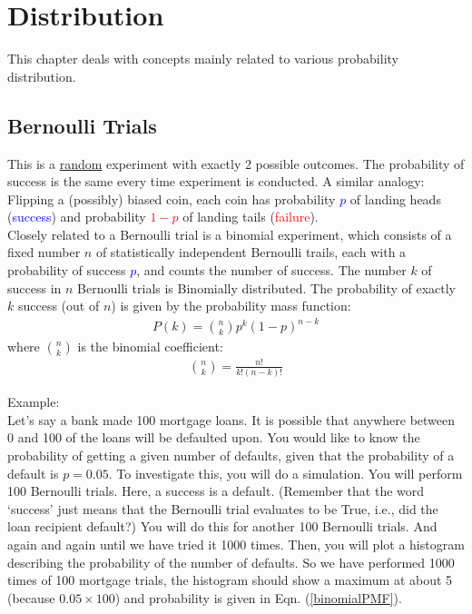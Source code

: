 \graphicspath{%
{chapter1graph/}%
{chapter1graph/bg/}}


\chapter{Distribution}

This chapter deals with concepts mainly related to various probability distribution.

\section{Bernoulli Trials}

This is a \underline{random} experiment with exactly 2 possible outcomes. The probability of success is the same every time experiment is conducted. A similar analogy: Flipping a (possibly) biased coin, each coin has probability \textcolor{blue}{$p$} of landing heads (\textcolor{blue}{success}) and probability \textcolor{red}{$1 - p$} of landing tails (\textcolor{red}{failure}).  \\

Closely related to a Bernoulli trial is a binomial experiment, which consists of a fixed number $n$ of statistically independent Bernoulli trails, each with a probability of success \textcolor{blue}{$p$}, and counts the number of success. The number $k$ of success in $n$ Bernoulli trials is Binomially distributed. The probability of exactly $k$ success (out of $n$) is given by the probability mass function: 
\begin{eqnarray}
P(k) = \binom{n}{k} p^k (1-p)^{n-k}
\label{binomialPMF}
\end{eqnarray}
where $\binom{n}{k}$ is the binomial coefficient:
\begin{eqnarray}
\binom{n}{k} = \frac{n !}{k! (n-k)!}
\label{binomialcoef}
\end{eqnarray}

Example:\\
Let's say a bank made 100 mortgage loans. It is possible that anywhere between 0 and 100 of the loans will be defaulted upon. You would like to know the probability of getting a given number of defaults, given that the probability of a default is $p = 0.05$. To investigate this, you will do a simulation. You will perform 100 Bernoulli trials. Here, a success is a default. (Remember that the word `success' just means that the Bernoulli trial evaluates to be True, i.e., did the loan recipient default?) You will do this for another 100 Bernoulli trials. And again and again until we have tried it 1000 times. Then, you will plot a histogram describing the probability of the number of defaults. So we have performed 1000 times of 100 mortgage trials, the histogram should show a maximum at about 5 (because $0.05 \times 100$) and probability is given in Eqn. (\ref{binomialPMF}). \\   


